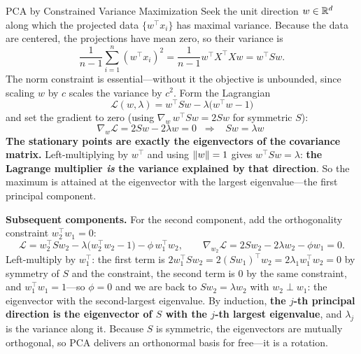 \begin{mathresult}{PCA by Constrained Variance Maximization}
Seek the unit direction $w \in \mathbb{R}^d$ along which the projected data $\{w^\top x_i\}$ has maximal variance. Because the data are centered, the projections have mean zero, so their variance is
\begin{equation}
\frac{1}{n-1}\sum_{i=1}^n (w^\top x_i)^2 = \frac{1}{n-1} w^\top X^\top X w = w^\top S w .
\end{equation}
The norm constraint is essential---without it the objective is unbounded, since scaling $w$ by $c$ scales the variance by $c^2$. Form the Lagrangian
\begin{equation}
\mathcal{L}(w, \lambda) = w^\top S w - \lambda\big(w^\top w - 1\big)
\end{equation}
and set the gradient to zero (using $\nabla_w\, w^\top S w = 2Sw$ for symmetric $S$):
\begin{equation}
\nabla_w \mathcal{L} = 2Sw - 2\lambda w = 0 \;\;\Longrightarrow\;\; \boxed{\;S w = \lambda w\;}
\end{equation}
\textbf{The stationary points are exactly the eigenvectors of the covariance matrix.} Left-multiplying by $w^\top$ and using $\left\lVert w\right\rVert = 1$ gives $w^\top S w = \lambda$: \textbf{the Lagrange multiplier \emph{is} the variance explained by that direction}. So the maximum is attained at the eigenvector with the largest eigenvalue---the first principal component.

\textbf{Subsequent components.} For the second component, add the orthogonality constraint $w_2^\top w_1 = 0$:
\begin{equation}
\mathcal{L} = w_2^\top S w_2 - \lambda\big(w_2^\top w_2 - 1\big) - \phi\, w_1^\top w_2, \qquad
\nabla_{w_2}\mathcal{L} = 2Sw_2 - 2\lambda w_2 - \phi w_1 = 0 .
\end{equation}
Left-multiply by $w_1^\top$: the first term is $2w_1^\top S w_2 = 2(Sw_1)^\top w_2 = 2\lambda_1 w_1^\top w_2 = 0$ by symmetry of $S$ and the constraint, the second term is $0$ by the same constraint, and $w_1^\top w_1 = 1$---so $\phi = 0$ and we are back to $Sw_2 = \lambda w_2$ with $w_2 \perp w_1$: the eigenvector with the second-largest eigenvalue. By induction, \textbf{the $j$-th principal direction is the eigenvector of $S$ with the $j$-th largest eigenvalue}, and $\lambda_j$ is the variance along it. Because $S$ is symmetric, the eigenvectors are mutually orthogonal, so PCA delivers an orthonormal basis for free---it is a rotation.
\end{mathresult}


